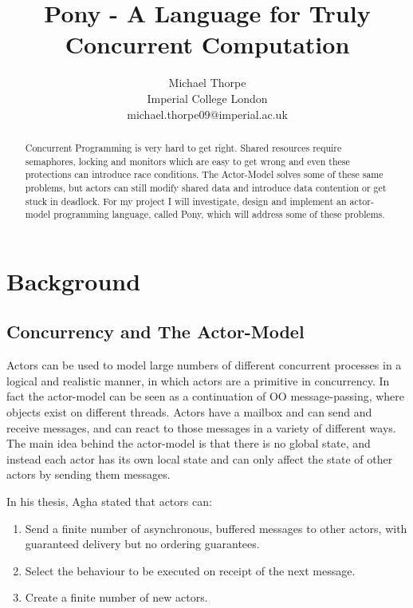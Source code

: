 \documentclass{article}
\begin{document}
\title{Pony - A Language for Truly Concurrent Computation}

\author{ 	Michael Thorpe\\
		Imperial College London\\
		michael.thorpe09@imperial.ac.uk}

\maketitle

\setcounter{tocdepth}{2}
\tableofcontents

\newpage
\begin{abstract}

Concurrent Programming is very hard to get right.
Shared resources require semaphores, locking and monitors which are easy to get wrong and even these protections can introduce race conditions.
The Actor-Model solves some of these same problems, but actors can still modify shared data and introduce data contention or get stuck in deadlock.
For my project I will investigate, design and implement an actor-model programming language, called Pony, which will address some of these problems.
\end{abstract}

\section{Background}

\subsection{Concurrency and The Actor-Model}

Actors can be used to model large numbers of different concurrent processes in a logical and realistic manner, in which actors are a primitive in concurrency.
In fact the actor-model can be seen as a continuation of OO message-passing, where objects exist on different threads.
Actors have a mailbox and can send and receive messages, and can react to those messages in a variety of different ways.
The main idea behind the actor-model is that there is no global state, and instead each actor has its own local state and can only affect the state of other actors by sending them messages.

In his thesis, Agha\cite{agha1985} stated that actors can:
\begin{enumerate}[noitemsep]
\item Send a finite number of asynchronous, buffered messages to other actors, with guaranteed delivery but no ordering guarantees.
\item Select the behaviour to be executed on receipt of the next message.
\item Create a finite number of new actors.
\end{enumerate}
\end{document}
